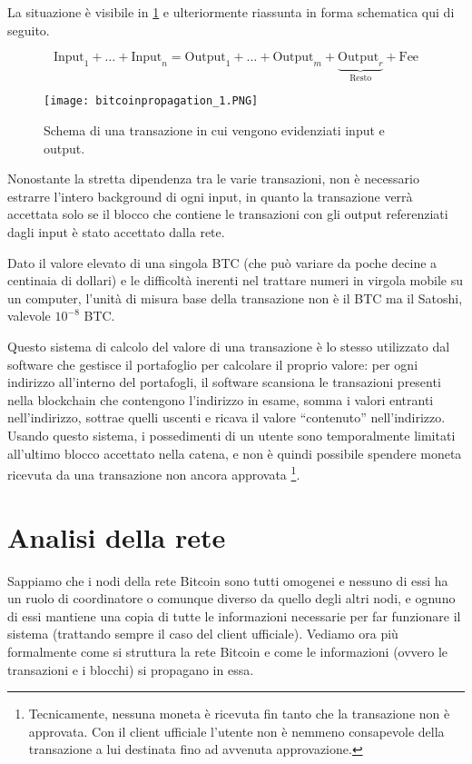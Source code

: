 La situazione è visibile in \ref{bitcoinpropagation_1} e ulteriormente riassunta in forma schematica qui di seguito.

$$ \text{Input}_1 + \dots + \text{Input}_n = \text{Output}_1 + \dots + \text{Output}_m + \underbrace{\text{Output}_r}_\text{Resto} + \text{Fee}$$

\begin{figure}[htbp]
\centering
\texttt{[image: bitcoinpropagation\_1.PNG]}
\caption[Schema di transazione]{Schema di una transazione in cui vengono evidenziati input e output.\label{bitcoinpropagation_1}}
\end{figure}

Nonostante la stretta dipendenza tra le varie transazioni, non è necessario estrarre l'intero background di ogni input, in quanto la transazione verrà accettata solo se il blocco che contiene le transazioni con gli output referenziati dagli input è stato accettato dalla rete.

Dato il valore elevato di una singola BTC (che può variare da poche decine a centinaia di dollari) e le difficoltà inerenti nel trattare numeri in virgola mobile su un computer, l'unità di misura base della transazione non è il BTC ma il Satoshi, valevole $10^{-8}$ BTC.

Questo sistema di calcolo del valore di una transazione è lo stesso utilizzato dal software che gestisce il portafoglio per calcolare il proprio valore: per ogni indirizzo all'interno del portafogli, il software scansiona le transazioni presenti nella blockchain che contengono l'indirizzo in esame, somma i valori entranti nell'indirizzo, sottrae quelli uscenti e ricava il valore ``contenuto'' nell'indirizzo. Usando questo sistema, i possedimenti di un utente sono temporalmente limitati all'ultimo blocco accettato nella catena, e non è quindi possibile spendere moneta ricevuta da una transazione non ancora approvata \footnote{Tecnicamente, nessuna moneta è ricevuta fin tanto   che la transazione non è approvata. Con il client ufficiale l'utente non è nemmeno consapevole   della transazione a lui destinata fino ad avvenuta approvazione.}.

\section{Analisi della rete}\label{analisi-della-rete}

Sappiamo che i nodi della rete Bitcoin sono tutti omogenei e nessuno di essi ha un ruolo di coordinatore o comunque diverso da quello degli altri nodi, e ognuno di essi mantiene una copia di tutte le informazioni necessarie per far funzionare il sistema (trattando sempre il caso del client ufficiale). Vediamo ora più formalmente come si struttura la rete Bitcoin e come le informazioni (ovvero le transazioni e i blocchi) si propagano in essa.

